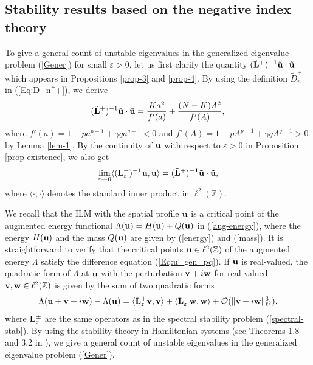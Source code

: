 \documentclass[12pt,reqno]{amsart}
\begin{document}
\subsection{Stability results based on the negative index theory}
\label{Sec:NegativeIndex}

To give a general count of unstable eigenvalues in the generalized eigenvalue problem (\ref{Gener}) for small $\varepsilon > 0$, let us first clarify 
the quantity $ (\tilde{\bf L}^+)^{-1} \tilde{\bf u} \cdot \tilde{\bf u} $ 
which appears in Propositions \ref{prop-3} and \ref{prop-4}. By using 
the definition $\tilde{D}_n^+$ in (\ref{Eq:D_n^+}), we derive 
\begin{equation}
\label{neg-3}
(\tilde{\bf L}^+)^{-1} \tilde{\bf u} \cdot \tilde{\bf u} = \frac{K a^2}{f'(a)} + \frac{(N-K) A^2}{f'(A)},
\end{equation}
where $f'(a) = 1 - p a^{p-1} + \gamma q a^{q-1} < 0$ and $f'(A) = 1 - p A^{p-1} + \gamma q A^{q-1} > 0$ by Lemma \ref{lem-1}. By the continuity of ${\bf u}$ with respect to $\varepsilon > 0$ in Proposition \ref{prop-existence}, we also 
get 
\begin{equation}
\label{neg-4}
\lim_{\varepsilon \to 0} \langle (\bf{L}^+_{\varepsilon})^{-1} {\bf u}, {\bf u} \rangle = (\tilde{\bf L}^+)^{-1} \tilde{\bf u} \cdot \tilde{\bf u}, 
\end{equation}
where $\langle \cdot, \cdot \rangle$ denotes the standard inner product in $\ell^2(\mathbb{Z})$. 

We recall that the ILM with the spatial profile ${\bf u}$ is a critical point 
of the augmented energy functional $\Lambda({\bf u}) = H({\bf u}) + Q({\bf u})$ in (\ref{aug-energy}), where the energy $H({\bf u})$ and the mass $Q({\bf u})$ are given by (\ref{energy}) and (\ref{mass}). It is straightforward to verify that the critical points ${\bf u} \in \ell^2(\mathbb{Z})$ of the augmented energy $\Lambda$ satisfy the difference equation (\ref{Eq:u_gen_pq}). If ${\bf u}$ is real-valued, the quadratic form of $\Lambda$ at ${\bf u}$ with the perturbation ${\bf v} + i {\bf w}$ for real-valued ${\bf v}, {\bf w} \in \ell^2(\mathbb{Z})$ is given by the sum of two quadratic forms 
\begin{equation*}
\Lambda({\bf u} + {\bf v} + i {\bf w}) - \Lambda({\bf u}) = \langle {\bf L}^+_{\varepsilon} {\bf v}, {\bf v} \rangle + \langle {\bf L}^-_{\varepsilon} {\bf w}, {\bf w} \rangle + \mathcal{O}(\| {\bf v} + i {\bf w} \|^3_{\ell^2}),
\end{equation*}
where ${\bf L}^{\pm}_{\varepsilon}$ are the same operators as in the spectral stability problem (\ref{spectral-stab}). By using the stability theory in Hamiltonian systems (see Theorems 1.8 and 3.2 in \cite{GP25}), we give a general count of unstable eigenvalues 
in the generalized eigenvalue problem (\ref{Gener}). 
\end{document}
